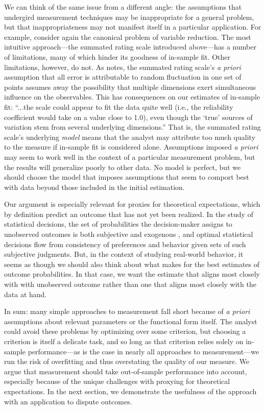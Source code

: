 We can think of the same issue from a different angle: the assumptions that undergird measurement techniques may be inappropriate for a general problem, but that inappropriateness may not manifest itself in a particular application.
For example, consider again the canonical problem of variable reduction.
The most intuitive approach---the summated rating scale introduced above---has a number of limitations, many of which hinder its goodness of in-sample fit.
Other limitations, however, do not.
As \citet[40]{jacoby1991} notes, the summated rating scale's \emph{a priori} assumption that all error is attributable to random fluctuation in one set of points assumes away the possibility that multiple dimensions exert simultaneous influence on the observables.
This has consequences on our estimates of in-sample fit:  ``...the scale could appear to fit the data quite well (i.e., the reliability coefficient would take on a value close to 1.0), even though the `true' sources of variation stem from several underlying dimensions.'' 
That is, the summated rating scale's underlying \emph{model} means that the analyst may attribute too much quality to the measure if in-sample fit is considered alone.
Assumptions imposed \emph{a priori} may seem to work well in the context of a particular measurement problem, but the results will generalize poorly to other data.
No model is perfect, but we should choose the model that imposes assumptions that seem to comport best with data beyond those included in the initial estimation.

Our argument is especially relevant for proxies for theoretical expectations, which by definition predict an outcome that has not yet been realized.
In the study of statistical decisions, the set of probabilities the decision-maker assigns to unobserved outcomes is both subjective and exogenous \citep[e.g.][Chapters 2--3]{pratt1995}, and optimal statistical decisions flow from consistency of preferences and behavior given sets of such subjective judgments.
But, in the context of studying real-world behavior, it seems as though we should also think about what makes for the best estimates of outcome probabilities.
In that case, we want the estimate that aligns most closely with with unobserved outcome rather than one that aligns most closely with the data at hand.

In sum:  many simple approaches to measurement fall short because of \emph{a priori} assumptions about relevant parameters or the functional form itself.
The analyst could avoid these problems by optimizing over some criterion, but choosing a criterion is itself a delicate task, and so long as that criterion relies solely on in-sample performance---as is the case in nearly all approaches to measurement---we run the risk of overfitting and thus overstating the quality of our measure.
We argue that measurement should take out-of-sample performance into account, especially because of the unique challenges with proxying for theoretical expectations.
In the next section, we demonstrate the usefulness of the approach with an application to dispute outcomes.

